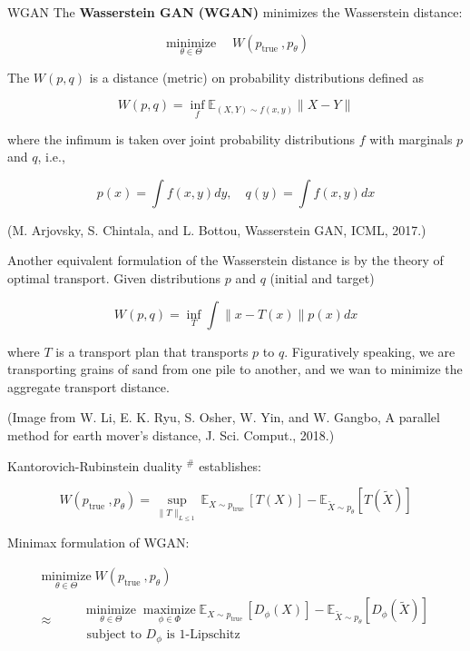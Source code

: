\begin{frame}[allowframebreaks]

\begin{mydefinitionblock}{21.29}{WGAN}
    The \textbf{Wasserstein GAN (WGAN)} minimizes the Wasserstein distance:

    $$
    \underset{\theta \in \Theta}{\operatorname{minimize}} \quad W\left(p_{\text {true }}, p_{\theta}\right)
    $$

    The $W(p, q)$ is a distance (metric) on probability distributions defined as

    $$
    W(p, q)=\inf _{f} \mathbb{E}_{(X, Y) \sim f(x, y)}\|X-Y\|
    $$

    where the infimum is taken over joint probability distributions $f$ with marginals $p$ and $q$, i.e.,

    $$
    p(x)=\int f(x, y) d y, \quad q(y)=\int f(x, y) d x
    $$

    (M. Arjovsky, S. Chintala, and L. Bottou, Wasserstein GAN, ICML, 2017.)

    \par\noindent\textcolor{gray}{\hdashrule{\textwidth}{0.4pt}{1pt 2pt}}

    Another equivalent formulation of the Wasserstein distance is by the theory of optimal transport. Given distributions $p$ and $q$ (initial and target)

    $$
    W(p, q)=\inf _{T} \int\|x-T(x)\| p(x) d x
    $$

    where $T$ is a transport plan that transports $p$ to $q$.
    Figuratively speaking, we are transporting grains of sand from one pile to another, and we wan to minimize the aggregate transport distance.

    (Image from W. Li, E. K. Ryu, S. Osher, W. Yin, and W. Gangbo, A parallel method for earth mover’s distance, J. Sci. Comput., 2018.)

    \par\noindent\textcolor{gray}{\hdashrule{\textwidth}{0.4pt}{1pt 2pt}}

    Kantorovich-Rubinstein duality $^{\#}$ establishes:

    $$
    W\left(p_{\text {true }}, p_{\theta}\right)=\sup _{\|T\|_{L \leq 1}} \mathbb{E}_{X \sim p_{\text {true }}}[T(X)]-\mathbb{E}_{\tilde{X} \sim p_{\theta}}[T(\tilde{X})]
    $$

    Minimax formulation of WGAN:

    $$
    \begin{gathered}
    \underset{\theta \in \Theta}{\operatorname{minimize}} W\left(p_{\text {true }}, p_{\theta}\right) \\
    \approx \quad \begin{aligned}
    & \underset{\theta \in \Theta}{\operatorname{minimize}} \underset{\phi \in \Phi}{\operatorname{maximize}} \mathbb{E}_{X \sim p_{\text {true }}}[D_{\phi}(X)]-\mathbb{E}_{\tilde{X} \sim p_{\theta}}[D_{\phi}(\tilde{X})] \\
    & \text { subject to } D_{\phi} \text{ is } 1 \text{-Lipschitz}
    \end{aligned}
    \end{gathered}
    $$


\end{mydefinitionblock}
\end{frame}
